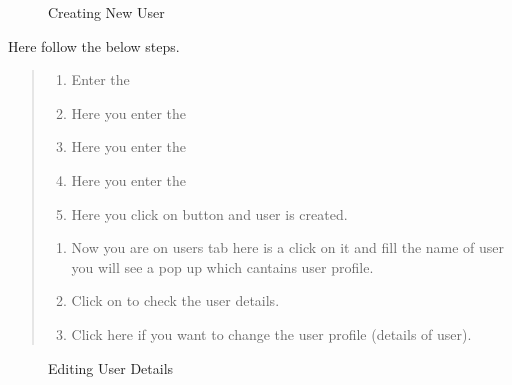\documentclass[a4paper,10pt,english]{report}
\begin{document}
\begin{figure}[htbp]
\centering
\capstart

\noindent{}
\caption{Creating New User}\label{\detokenize{mng users:id7}}\label{\detokenize{mng users:id2}}\end{figure}

Here follow the below steps.
\begin{quote}
\begin{enumerate}
\def\theenumi{\arabic{enumi}}
\def\labelenumi{\theenumi .}
\makeatletter\def\p@enumii{\p@enumi \theenumi .}\makeatother
\item {} 
Enter the 

\item {} 
Here you enter the 

\item {} 
Here you enter the 

\item {} 
Here you enter the 

\item {} 
Here you click on  button and user is created.

\end{enumerate}
\begin{enumerate}
\def\theenumi{\alph{enumi}}
\def\labelenumi{\theenumi .}
\makeatletter\def\p@enumii{\p@enumi \theenumi .}\makeatother
\setcounter{enumi}{1}
\item {} 
Now you are on users tab here is a  click on it and fill the name of user you will see a pop up which cantains user profile.

\item {} 
Click on  to check the user details.

\item {} 
Click here if you want to change the user profile (details of user).

\end{enumerate}
\end{quote}

\begin{figure}[htbp]
\centering
\capstart

\noindent{}
\caption{Editing User Details}\label{\detokenize{mng users:id8}}\label{\detokenize{mng users:id3}}\end{figure}
\end{document}
